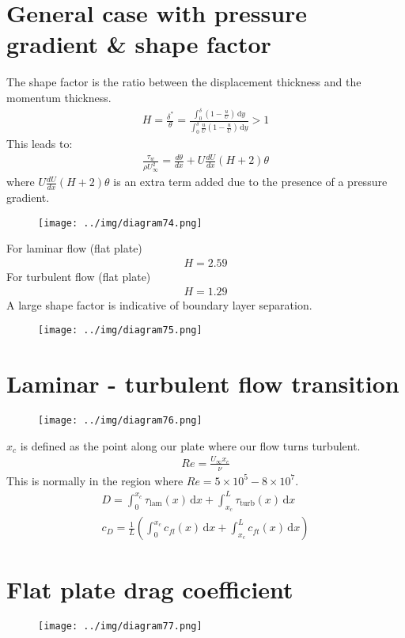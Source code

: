\documentclass[class=report, crop=false, 12pt,a4paper]{standalone}
\begin{document}
\section{General case with pressure gradient \& shape factor}
The shape factor is the ratio between the displacement thickness and the momentum thickness.
\begin{align}
  H = \frac{\delta^*}{\theta} = \frac{\int_{0}^{\delta} \left(1 - \frac{u}{U}\right) \,\mathrm{d}y}{\int_{0}^{\delta} \frac{u}{U} \left(1 - \frac{u}{U}\right) \,\mathrm{d}y} > 1
\end{align}
This leads to:
\begin{align}
  \frac{\tau_w}{\rho U_\infty^2} = \frac{d\theta}{dx} + U \frac{dU}{dx} (H + 2)\theta
\end{align}
where $U \frac{dU}{dx} (H + 2)\theta$ is an extra term added due to the presence of a pressure gradient. 
\begin{figure}[H]
  \centering
  \texttt{[image: ../img/diagram74.png]}
\end{figure}
For laminar flow (flat plate)
\begin{align}
  H = 2.59
\end{align}
For turbulent flow (flat plate)
\begin{align}
  H = 1.29
\end{align}
A large shape factor is indicative of boundary layer separation.
\begin{figure}[H]
  \centering
  \texttt{[image: ../img/diagram75.png]}
\end{figure}
\section{Laminar - turbulent flow transition}
\begin{figure}[H]
  \centering
  \texttt{[image: ../img/diagram76.png]}
\end{figure}
$x_c$ is defined as the point along our plate where our flow turns turbulent.
\begin{gather}
  Re = \frac{U_\infty x_c}{\nu}
\end{gather}
This is normally in the region where $Re = 5 \times 10^5 - 8\times 10^7$.
\begin{align}
  D = \int_{0}^{x_c} \tau_{\textrm{lam}} (x) \,\mathrm{d}x + \int_{x_c}^{L} \tau_{\textrm{turb}} (x) \,\mathrm{d}x\\
  c_D = \frac{1}{L} \left( \int_{0}^{x_c} c_{fl} (x) \,\mathrm{d}x + \int_{x_c}^{L} c_{ft} (x) \,\mathrm{d}x  \right)  
\end{align}
\section{Flat plate drag coefficient}
\begin{figure}[H]
  \centering
  \texttt{[image: ../img/diagram77.png]}
\end{figure}
\end{document}

